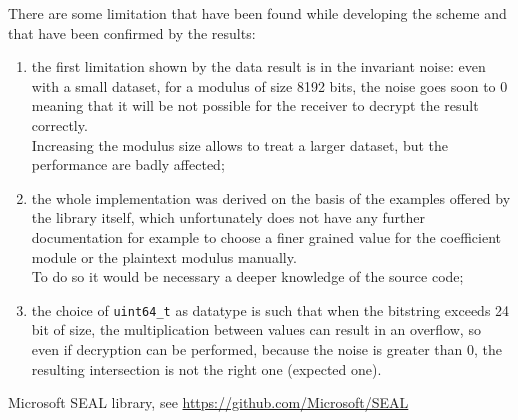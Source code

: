 \documentclass[10pt]{extarticle}
\begin{document}
\newpage
There are some limitation that have been found while developing the scheme and that have been confirmed by the results:
\begin{enumerate}
	\item the first limitation shown by the data result is in the invariant noise: even with a small dataset, for a modulus of size 8192 bits, the noise goes soon to 0 meaning that it will be not possible for the receiver to decrypt the result correctly.\\Increasing the modulus size allows to treat a larger dataset, but the performance are badly affected;
	\item the whole implementation was derived on the basis of the examples offered by the library itself, which unfortunately does not have any further documentation for example to choose a finer grained value for the coefficient module or the plaintext modulus manually.\\To do so it would be necessary a deeper knowledge of the source code;
	\item the choice of \texttt{uint64\_t} as datatype is such that when the bitstring exceeds 24 bit of size, the multiplication between values can result in an overflow, so even if decryption can be performed, because the noise is greater than 0, the resulting intersection is not the right one (expected one).
\end{enumerate}

\begin{thebibliography}{12}
	 Microsoft SEAL library, see \href{https://github.com/Microsoft/SEAL}{https://github.com/Microsoft/SEAL}
\end{thebibliography}
\end{document}
